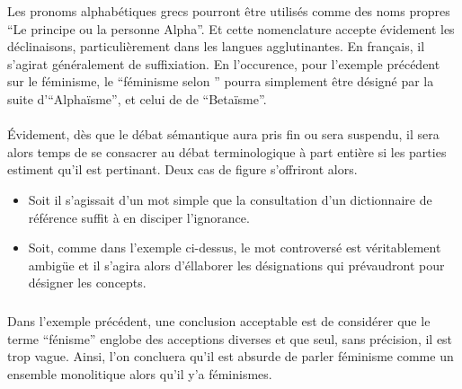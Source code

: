 Les pronoms alphabétiques grecs pourront être utilisés comme des noms propres \enquote{Le principe ou la personne Alpha}. Et cette nomenclature accepte évidement les déclinaisons, particulièrement dans les langues agglutinantes. En français, il s’agirat généralement de suffixiation. En l’occurence, pour l’exemple précédent sur le féminisme, le \enquote{féminisme selon \A} pourra simplement être désigné par la suite d’\enquote{Alphaïsme}, et celui de \B de \enquote{Betaïsme}.

\paragraph{}
Évidement, dès que le débat sémantique aura pris fin ou sera suspendu, il sera alors temps de se consacrer au débat terminologique à part entière si les parties estiment qu’il est pertinant. Deux cas de figure s’offriront alors.
\begin{itemize}
  \item Soit il s’agissait d’un mot simple que la consultation d’un dictionnaire de référence suffit à en disciper l’ignorance.

  \item Soit, comme dans l’exemple ci-dessus, le mot controversé est véritablement ambigüe et il s’agira alors d’éllaborer les désignations qui prévaudront pour désigner les concepts.
\end{itemize}

\subparagraph{}
Dans l’exemple précédent, une conclusion acceptable est de considérer que le terme \enquote{fénisme} englobe des acceptions diverses et que seul, sans précision, il est trop vague. Ainsi, l’on concluera qu’il est absurde de parler  féminisme comme un ensemble monolitique alors qu’il y’a  féminismes.






